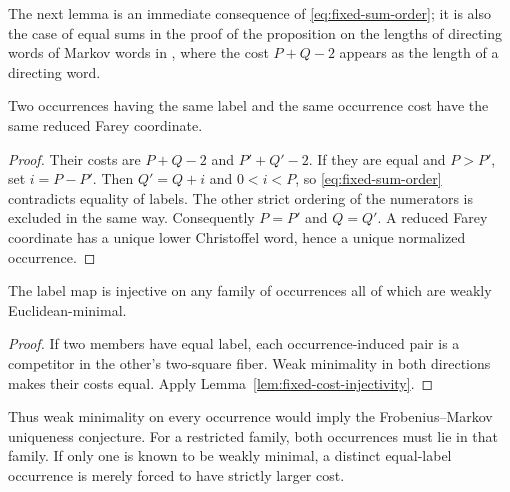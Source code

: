 The next lemma is an immediate consequence of \eqref{eq:fixed-sum-order};
it is also the case of equal sums in the proof of the proposition on the
lengths of directing words of Markov words in
\cite{DutykhVuillon2026Reflections}, where the cost $P+Q-2$ appears as the
length of a directing word.

\begin{lemma}\label{lem:fixed-cost-injectivity}
Two occurrences having the same label and the same occurrence cost
have the same reduced Farey coordinate.
\end{lemma}

\begin{proof}
Their costs are $P+Q-2$ and $P'+Q'-2$. If they are equal and
$P>P'$, set $i=P-P'$. Then $Q'=Q+i$ and $0<i<P$, so
\eqref{eq:fixed-sum-order} contradicts equality of labels. The other
strict ordering of the numerators is excluded in the same way.
Consequently $P=P'$ and $Q=Q'$. A reduced Farey coordinate has a unique
lower Christoffel word, hence a unique normalized occurrence.
\end{proof}

\begin{corollary}\label{cor:restricted-injectivity}
The label map is injective on any family of occurrences all of which
are weakly Euclidean-minimal.
\end{corollary}

\begin{proof}
If two members have equal label, each occurrence-induced pair is a
competitor in the other's two-square fiber. Weak minimality in both
directions makes their costs equal. Apply
Lemma~\ref{lem:fixed-cost-injectivity}.
\end{proof}

Thus weak minimality on every occurrence would imply the
Frobenius--Markov uniqueness conjecture. For a restricted family, both occurrences
must lie in that family. If only one is known to be weakly minimal, a
distinct equal-label occurrence is merely forced to have strictly
larger cost.

